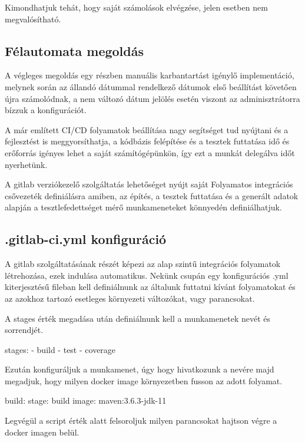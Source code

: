 Kimondhatjuk tehát, hogy saját számolások elvégzése, jelen esetben nem megvalósítható.

\subsection{Félautomata megoldás}

A végleges megoldás egy részben manuális karbantartást igénylő implementáció, melynek során az állandó dátummal rendelkező dátumok első beállítást követően újra számolódnak, a nem változó dátum jelölés esetén viszont az adminisztrátorra bízzuk a konfigurációt.


A már említett CI/CD folyamatok beállítása nagy segítséget tud nyújtani és a fejlesztést is meggyorsíthatja, a kódbázis felépítése és a tesztek futtatása idő és erőforrás igényes lehet a saját számítógépünkön, így ezt a munkát delegálva időt nyerhetünk. 

A gitlab verziókezelő szolgáltatás lehetőséget nyújt saját Folyamatos integrációs csővezeték definiálásra amiben, az építés, a tesztek futtatása és a generált adatok alapján a tesztlefedettséget mérő munkameneteket könnyedén definiálhatjuk.

\subsection{.gitlab-ci.yml konfiguráció}

A gitlab szolgáltatásának részét képezi az alap szintű integrációs folyamatok létrehozása, ezek indulása automatikus. Nekünk csupán egy konfigurációs .yml kiterjesztésű fileban kell definiálnunk az általunk futtatni kívánt folyamatokat és az azokhoz tartozó esetleges környezeti változókat, vagy parancsokat.

A stages érték megadása után definiálnunk kell a munkamenetek nevét és sorrendjét.
 \begin{python}
 	stages:
 	  - build
 	  - test
 	  - coverage
 \end{python} 

Ezután konfiguráljuk a munkamenet, úgy hogy hivatkozunk a nevére majd megadjuk, hogy milyen docker image környezetben fusson az adott folyamat.

\begin{python}
	build:
	  stage: build
	  image: maven:3.6.3-jdk-11
\end{python}

Legvégül a script érték alatt  felsoroljuk milyen parancsokat hajtson végre a docker imagen belül. 

